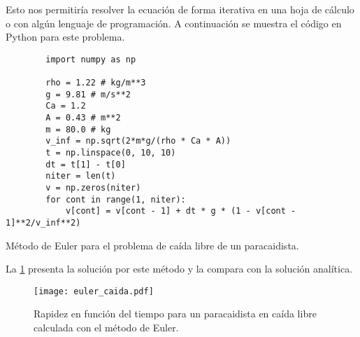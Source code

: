 Esto nos permitiría resolver la ecuación de forma iterativa en una hoja de cálculo o con algún lenguaje de programación. A continuación se muestra el código en Python para este problema.
\begin{listing}[H]
    \begin{verbatim}
        import numpy as np

        rho = 1.22 # kg/m**3
        g = 9.81 # m/s**2
        Ca = 1.2
        A = 0.43 # m**2
        m = 80.0 # kg
        v_inf = np.sqrt(2*m*g/(rho * Ca * A))
        t = np.linspace(0, 10, 10)
        dt = t[1] - t[0]
        niter = len(t)
        v = np.zeros(niter)
        for cont in range(1, niter):
            v[cont] = v[cont - 1] + dt * g * (1 - v[cont - 1]**2/v_inf**2)
    \end{verbatim}
    \caption{Método de Euler para el problema de caída libre de un paracaidista.}
    \label{lst:euler}
\end{listing}

La \cref{fig:euler_caida} presenta la solución por este método y la compara con la solución analítica.
\begin{figure}[H] 
\centering
\texttt{[image: euler\_caida.pdf]}
\caption{Rapidez en función del tiempo para un paracaidista en caída libre calculada con el método de Euler.}
\label{fig:euler_caida}
\end{figure}


